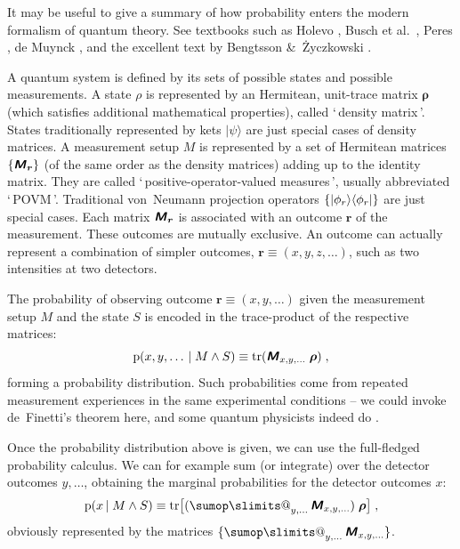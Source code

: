 \documentclass[\ifafour a4paper,12pt,\else a5paper,10pt,\fi%
onecolumn,oneside,article,%
british%
]{memoir}
\makeatletter
\newcommand*{\defquote}[1]{`\,#1\,'}
\theoremstyle{remark}
\theoremstyle{innote}
\def\sum{\DOTSI\sumop\slimits@}
\newcommand*{\mathte}[1]{\textbf{\textit{\textsf{#1}}}}
\newcommand*{\citep}{\parencites}%
\newcommand*{\citey}{\parencites*}
\newcommand*{\amp}{\&}
\DeclareMathOperator{\tr}{tr}%
\DeclarePairedDelimiter\set{\{}{\}}
\newcommand*{\pf}{\mathrm{p}}%
\renewcommand*{\|}[1][]{\nonscript\,#1\vert\nonscript\;\mathopen{}}
\newcommand*{\chap}{ch.}%
\newcommand*{\etal}{{et al.}}
\newcommand*{\tsum}{\mathop{\textstyle\sum}\nolimits}
\newcommand*{\yr}{\bm{\rho}}
\newcommand*{\yM}{\mathte{M}}
\makeatother
\begin{document}
It may be useful to give a summary of how probability enters the modern
formalism of quantum theory. See textbooks such as Holevo
\citey{holevo1980_t2011}, Busch \etal\ \citey{buschetal1995b}, Peres
\citey[especially \chap~12]{peres1995}, de Muynck \citey[especially
\chap~3]{demuynck2002b}, and the excellent text by Bengtsson \amp\
\.Zyczkowski \citey{bengtssonetal2006_r2017}.

A quantum system is defined by its sets of possible states and possible
measurements. A state $\rho$ is represented by an Hermitean, unit-trace
matrix $\yr$ (which satisfies additional mathematical properties), called
\defquote{density matrix}. States traditionally represented by kets
$\lvert \psi \rangle$ are just special cases of density matrices. A
measurement setup $M$ is represented by a set of Hermitean matrices
$\set{\yM_{\bm{r}}}$ (of the same order as the density matrices) adding up
to the identity matrix. They are called \defquote{positive-operator-valued
  measures}, usually abbreviated \defquote{POVM}. Traditional von~Neumann
projection operators $\set{\lvert \phi_{r} \rangle\langle \phi_{r}\rvert}$
are just special cases. Each matrix $\yM_{\bm{r}}$ is associated with an
outcome $\bm{r}$ of the measurement. These outcomes are mutually exclusive.
An outcome can actually represent a combination of simpler outcomes,
$\bm{r}\equiv(x,y,z,\dotsc)$, such as two intensities at two detectors.

The probability of observing outcome $\bm{r}\equiv (x, y, \dotsc)$ given
the measurement setup $M$ and the state $S$ is encoded in the trace-product
of the respective matrices:
\begin{equation}
  \label{eq:povm_trace}
  \pf(x,y,\dotsc \| M \land S) \equiv \tr(\yM_{x,y,\dotsc}\;\yr) \;,
\end{equation}
forming a probability distribution. Such probabilities come from repeated
measurement experiences in the same experimental conditions -- we could
invoke de~Finetti's theorem here, and some quantum physicists indeed do
\citep{cavesetal2002,vanenketal2002,fuchsetal2004b}.

Once the probability distribution above is given, we can use the
full-fledged probability calculus. We can for example sum (or integrate) over the
detector outcomes $y,\dotsc$, obtaining the marginal probabilities for
the detector outcomes $x$:
\begin{equation}
  \label{eq:povm_trace_marginal}
  \pf(x\| M \land S) \equiv
  \tr\bigl[(\tsum_{y,\dotsc}\yM_{x,y,\dotsc})\;\yr\bigr] \;,
\end{equation}
obviously represented by the matrices $\set{\tsum_{y,\dotsc}\yM_{x,y,\dotsc}}$.
\end{document}
